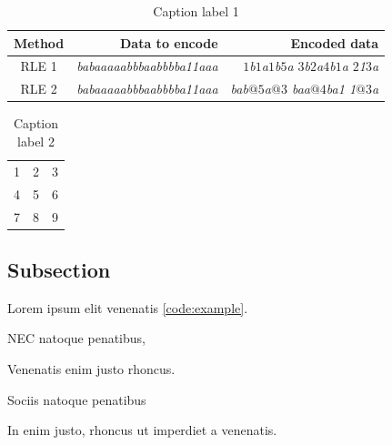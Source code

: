 \begin{table}\centering
   \begin{tabular}{|c|r|r|}
      \hline \textbf{Method} & \textbf{Data to encode} & \textbf{Encoded data} \\\hline
      RLE 1 & \textit{babaaaaabbbaabbbba11aaa} & \textit{$1$b$1$a$1$b$5$a $3$b$2$a$4$b$1$a $2$1$3$a} \\\hline
      RLE 2 & \textit{babaaaaabbbaabbbba11aaa} & \textit{bab$@5$a$@3$ baa$@4$ba1 1$@3$a} \\\hline
   \end{tabular}
   \caption[List label 1]{Caption label 1}\label{tab:example1}
\end{table}

\begin{table}\centering
   \begin{tabular}{| l | c r |}
      \hline
      1 & 2 & 3 \\
      4 & 5 & 6 \\
      7 & 8 & 9 \\
      \hline
   \end{tabular}
   \caption[List label 2]{Caption label 2}\label{tab:example2}
\end{table}


\subsection{Subsection}
Lorem ipsum  elit venenatis \ref{code:example}.

\begin{dl}
	\item[NEC] natoque penatibus,
	\item[Venenatis] enim justo rhoncus.
\end{dl}

\begin{ol}
	\item {Sociis natoque penatibus}
\end{ol}

\begin{ul}
	\item In enim justo, rhoncus ut imperdiet a venenatis.
\end{ul}

